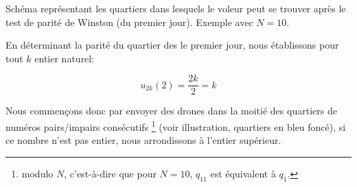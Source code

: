 \begin{figureleg}
\begin{center}
Schéma représentant les quartiers dans lesquels le voleur peut se trouver après le test de parité de Winston (du premier jour). Exemple avec $N=10$.
\end{center}
\end{figureleg}

En déterminant la parité du quartier des le premier jour, nous établissons pour tout $k$ entier naturel: 

$$u_{2k}(2)=\dfrac{2k}{2}=k$$

Nous commençons donc par envoyer des drones dans la moitié des quartiers de numéros pairs/impairs consécutifs \footnote{modulo $N$, c'est-à-dire que pour $N=10$, $q_{11}$ est équivalent à $q_1$.} (voir illustration, quartiers en bleu foncé), si ce nombre n'est pas entier, nous arrondissons à l'entier supérieur. 

